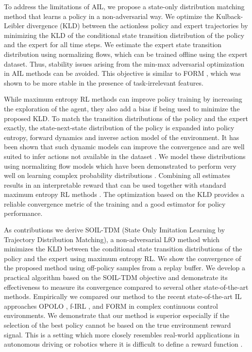\documentclass{article}
\begin{document}
To address the limitations of AIL, we propose a state-only distribution matching method that learns a policy in a non-adversarial way. We optimize the Kulback-Leibler divergence (KLD) between the actionless policy and expert trajectories by minimizing the KLD of the conditional state transition distribution of the policy and the expert for all time steps. We estimate the expert state transition distribution using normalizing flows, which can be trained offline using the expert dataset. Thus, stability issues arising from the min-max adversarial optimization in AIL methods can be avoided. This objective is similar to FORM \cite{jaegle2021imitation}, which was shown to be more stable in the presence of task-irrelevant features.

While maximum entropy RL methods \cite{Ziebart2010} can improve policy training by increasing the exploration of the agent, they also add a bias if being used to minimize the proposed KLD. To match the transition distributions of the policy and the expert exactly, the state-next-state distribution of the policy is expanded into policy entropy, forward dynamics and inverse action model of the environment. It has been shown that such dynamic models can improve the convergence \cite{zhu2020off} and are well suited to infer actions not available in the dataset \cite{torabi2018behavioral}. We model these distributions using normalizing flow models which have been demonstrated to perform very well on learning complex probability distributions \cite{papamakarios2019normalizing}. Combining all estimates results in an interpretable reward that can be used together with standard maximum entropy RL methods \cite{haarnoja2018SAC}. The optimization based on the KLD provides a reliable convergence metric of the training and a good estimator for policy performance. 

As contributions we derive SOIL-TDM (State Only Imitation Learning by Trajectory Distribution Matching), a non-adversarial LfO method which minimizes the KLD between the conditional state transition distributions of the policy and the expert using maximum entropy RL. We show the convergence of the proposed method using off-policy samples from a replay buffer. We develop a practical algorithm based on the SOIL-TDM objective and demonstrate its effectiveness to measure its convergence compared to several other state-of-the-art methods. Empirically we compared our method to the recent state-of-the-art IL approaches OPOLO \cite{zhu2020off}, f-IRL \cite{firl2020corl}, and FORM \cite{jaegle2021imitation} in complex continuous control environments. We demonstrate that our method is superior especially if the selection of the best policy cannot be based on the true environment reward signal. This is a setting which more closely resembles real-world applications in autonomous driving or robotics where it is difficult to define a reward function \cite{osa2018an}.  
\end{document}

